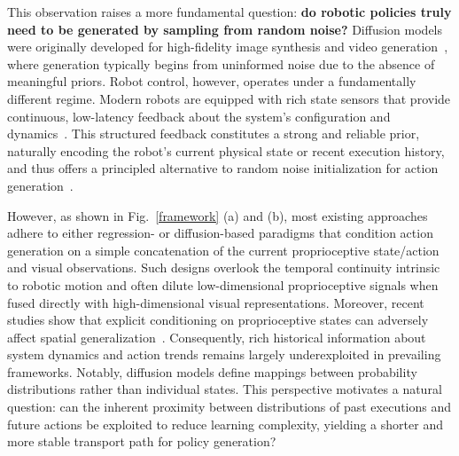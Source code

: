 This observation raises a more fundamental question: \textbf{do robotic policies truly need to be generated by sampling from random noise?} Diffusion models were originally developed for high-fidelity image synthesis and video generation~\citep{ddpm,song2020denoising,rombach2022high,flowmatching,rectifiedflow,blattmann2023stable}, where generation typically begins from uninformed noise due to the absence of meaningful priors. Robot control, however, operates under a fundamentally different regime. Modern robots are equipped with rich state sensors that provide continuous, low-latency feedback about the system’s configuration and dynamics~\citep{jia2024feedback, jia2024learning}. This structured feedback constitutes a strong and reliable prior, naturally encoding the robot’s current physical state or recent execution history, and thus offers a principled alternative to random noise initialization for action generation~\citep{jia2025foreseer}.


However, as shown in Fig.~\ref{framework} (a) and (b), most existing approaches adhere to either regression- or diffusion-based paradigms that condition action generation on a simple concatenation of the current proprioceptive state/action and visual observations. Such designs overlook the temporal continuity intrinsic to robotic motion and often dilute low-dimensional proprioceptive signals when fused directly with high-dimensional visual representations. Moreover, recent studies show that explicit conditioning on proprioceptive states can adversely affect spatial generalization~\citep{zhao2025you}.
Consequently, rich historical information about system dynamics and action trends remains largely underexploited in prevailing frameworks. Notably, diffusion models define mappings between probability distributions rather than individual states. This perspective motivates a natural question: can the inherent proximity between distributions of past executions and future actions be exploited to reduce learning complexity, yielding a shorter and more stable transport path for policy generation?

